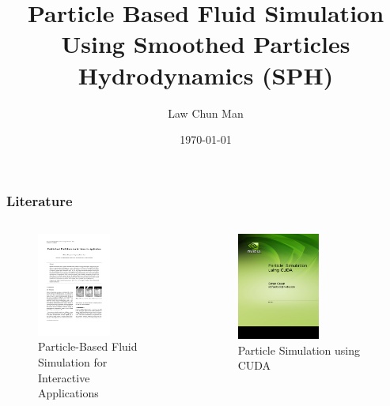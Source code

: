 \documentclass[aspectratio=169]{beamer}
\title[Highlights]{Particle Based Fluid Simulation Using Smoothed Particles Hydrodynamics (SPH)}
\author{Law Chun Man}
\institute{PHYS 4061 Literature Review}
\date{\today}
\begin{document}
\frame{\titlepage}





\begin{frame}
\frametitle{Literature}


\begin{columns}
\begin{column}{0.45\textwidth}
\begin{figure}
    \centering
    \includegraphics[width=0.6\textwidth]{pictures/paper_thumbnail.png}
    \caption{Particle-Based Fluid Simulation for Interactive Applications~\cite{muller2003particle}}
\end{figure}
\end{column}


\begin{column}{0.45\textwidth}
\begin{figure}
    \centering
    \includegraphics[width=0.6\textwidth]{pictures/paper_thumbnail2.png}
    \caption{Particle Simulation using CUDA~\cite{green2010particle}}
\end{figure}
\end{column}
\end{columns}


\end{frame}
\end{document}
